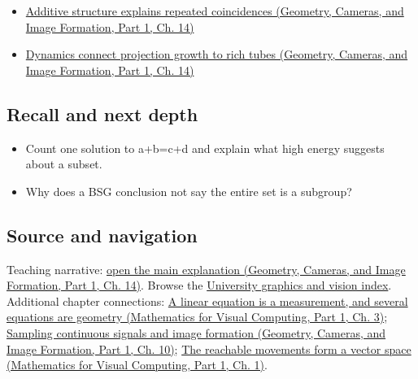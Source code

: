 \hypertarget{appendix-b0732b22e7d6-full-teaching-explanation}{}

\begin{itemize}
\tightlist
\item
  \href{../03-Geometry-Cameras-and-Image-Formation-P01/main.pdf\#04-visual-computing-ii-ch033-additive-structure-explains-repeated-coincidences}{Additive structure explains repeated coincidences (Geometry, Cameras, and Image Formation, Part 1, Ch. 14)}
\item
  \href{../03-Geometry-Cameras-and-Image-Formation-P01/main.pdf\#04-visual-computing-ii-ch033-dynamics-connect-projection-growth-to-rich-tubes}{Dynamics connect projection growth to rich tubes (Geometry, Cameras, and Image Formation, Part 1, Ch. 14)}
\end{itemize}

\subsection{Recall and next depth}\label{appendix-b0732b22e7d6-recall-and-next-depth}

\hypertarget{appendix-b0732b22e7d6-recall-and-next-depth}{}

\begin{itemize}
\tightlist
\item
  Count one solution to a+b=c+d and explain what high energy suggests about a subset.
\item
  Why does a BSG conclusion not say the entire set is a subgroup?
\end{itemize}

\subsection{Source and navigation}\label{appendix-b0732b22e7d6-source-and-navigation}

\hypertarget{appendix-b0732b22e7d6-source-and-navigation}{}

Teaching narrative: \href{../03-Geometry-Cameras-and-Image-Formation-P01/main.pdf\#04-visual-computing-ii-ch033-additive-structure-explains-repeated-coincidences}{open the main explanation (Geometry, Cameras, and Image Formation, Part 1, Ch. 14)}. Browse the \hyperref[appendix-a6d556a4ef50-university-graphics-vision-and-photography---independent-series]{University graphics and vision index}. Additional chapter connections: \href{../02-Mathematics-for-Visual-Computing-P01/main.pdf\#01-foundations-i-ch019-a-linear-equation-is-a-measurement-and-several-equations-are-geometry}{A linear equation is a measurement, and several equations are geometry (Mathematics for Visual Computing, Part 1, Ch. 3)}; \href{../03-Geometry-Cameras-and-Image-Formation-P01/main.pdf\#03-visual-computing-i-ch003-sampling-continuous-signals-and-image-formation}{Sampling continuous signals and image formation (Geometry, Cameras, and Image Formation, Part 1, Ch. 10)}; \href{../02-Mathematics-for-Visual-Computing-P01/main.pdf\#01-foundations-i-ch017-the-reachable-movements-form-a-vector-space}{The reachable movements form a vector space (Mathematics for Visual Computing, Part 1, Ch. 1)}.

